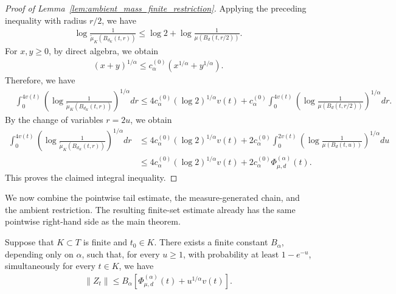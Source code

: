 \documentclass[11pt]{article}
\begin{document}
\begin{proof}[Proof of Lemma~\ref{lem:ambient_mass_finite_restriction}]
Applying the preceding inequality with radius $r/2$, we have
\begin{align*}
\log\frac{1}{\widetilde\mu_K(B_{d_K}(t,r))}
\le
\log2
+
\log\frac{1}{\mu(B_d(t,r/2))}.
\end{align*}
For $x,y\ge0$, by direct algebra, we obtain
\begin{align*}
(x+y)^{1/\alpha}
\le
c_\alpha^{(0)}
\left(x^{1/\alpha}+y^{1/\alpha}\right).
\end{align*}
Therefore, we have
\begin{align*}
&\int_0^{4v(t)}
\left(
\log\frac{1}{\widetilde\mu_K(B_{d_K}(t,r))}
\right)^{1/\alpha}dr\le
4c_\alpha^{(0)}(\log2)^{1/\alpha}v(t)+
c_\alpha^{(0)}
\int_0^{4v(t)}
\left(
\log\frac{1}{\mu(B_d(t,r/2))}
\right)^{1/\alpha}dr.
\end{align*}
By the change of variables $r=2u$, we obtain
\begin{align*}
\int_0^{4v(t)}
\left(
\log\frac{1}{\widetilde\mu_K(B_{d_K}(t,r))}
\right)^{1/\alpha}dr&\le
4c_\alpha^{(0)}(\log2)^{1/\alpha}v(t)+
2c_\alpha^{(0)}
\int_0^{2v(t)}
\left(
\log\frac{1}{\mu(B_d(t,u))}
\right)^{1/\alpha}du\\
&\le
4c_\alpha^{(0)}(\log2)^{1/\alpha}v(t)
+2c_\alpha^{(0)}\Phi_{\mu,d}^{(\alpha)}(t).
\end{align*}
This proves the claimed integral inequality.
\end{proof}

We now combine the pointwise tail estimate, the measure-generated chain,
and the ambient restriction. The resulting finite-set estimate already
has the same pointwise right-hand side as the main theorem.

\begin{lemma}
\label{lem:finite_ambient_pointwise_bound}
Suppose that $K\subset T$ is finite and $t_0\in K$. There exists a
finite constant $B_\alpha$, depending only on $\alpha$, such that, for
every $u\ge1$, with probability at least $1-e^{-u}$, simultaneously
for every $t\in K$, we have
\begin{align*}
\|Z_t\|
\le
B_\alpha
\left[
\Phi_{\mu,d}^{(\alpha)}(t)
+u^{1/\alpha}v(t)
\right].
\end{align*}
\end{lemma}
\end{document}

